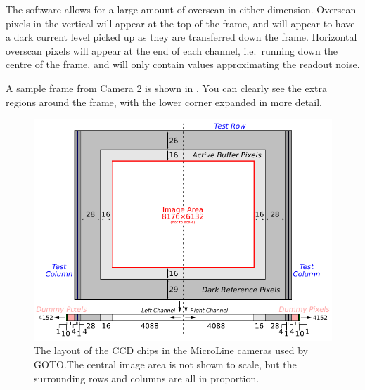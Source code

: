 \begin{colsection}
\begin{colsection}
The software allows for a large amount of overscan in either dimension. Overscan pixels in the vertical will appear at the top of the frame, and will appear to have a dark current level picked up as they are transferred down the frame. Horizontal overscan pixels will appear at the end of each channel, i.e.\ running down the centre of the frame, and will only contain values approximating the readout noise.

A sample frame from Camera 2 is shown in . You can clearly see the extra regions around the frame, with the lower corner expanded in more detail.

\begin{figure}[p]
    \begin{center}
        \includegraphics[width=\textwidth]{images/chip}
    \end{center}
    \caption[The layout of the CCD chips in the MicroLine cameras used by GOTO]{
        The layout of the CCD chips in the MicroLine cameras used by GOTO.\@ The central image area is not shown to scale, but the surrounding rows and columns are all in proportion.
        }\label{fig:chip}
\end{figure}


\end{colsection}
\end{colsection}
